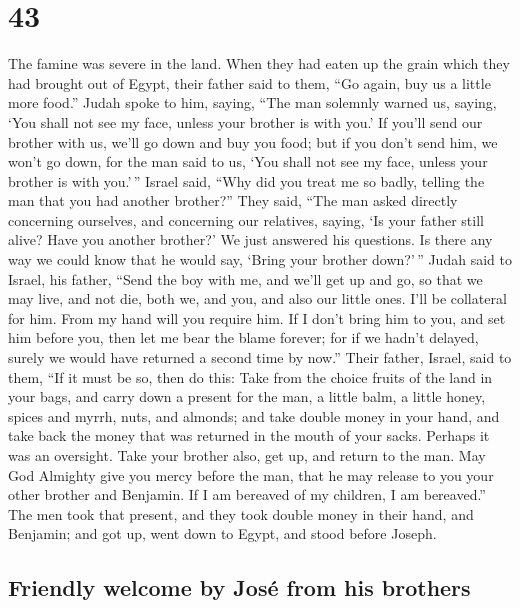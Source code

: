 \hypertarget{section-42}{%
\section{43}\label{section-42}}

 The famine was severe in the land.  When
they had eaten up the grain which they had brought out of Egypt, their
father said to them, ``Go again, buy us a little more food.''
 Judah spoke to him, saying, ``The man solemnly warned us,
saying, `You shall not see my face, unless your brother is with you.'
 If you'll send our brother with us, we'll go down and buy
you food;  but if you don't send him, we won't go down,
for the man said to us, `You shall not see my face, unless your brother
is with you.'\,''  Israel said, ``Why did you treat me so
badly, telling the man that you had another brother?'' 
They said, ``The man asked directly concerning ourselves, and concerning
our relatives, saying, `Is your father still alive? Have you another
brother?' We just answered his questions. Is there any way we could know
that he would say, `Bring your brother down?'\,''  Judah
said to Israel, his father, ``Send the boy with me, and we'll get up and
go, so that we may live, and not die, both we, and you, and also our
little ones.  I'll be collateral for him. From my hand
will you require him. If I don't bring him to you, and set him before
you, then let me bear the blame forever;  for if we
hadn't delayed, surely we would have returned a second time by now.''
 Their father, Israel, said to them, ``If it must be so,
then do this: Take from the choice fruits of the land in your bags, and
carry down a present for the man, a little balm, a little honey, spices
and myrrh, nuts, and almonds;  and take double money in
your hand, and take back the money that was returned in the mouth of
your sacks. Perhaps it was an oversight.  Take your
brother also, get up, and return to the man.  May God
Almighty give you mercy before the man, that he may release to you your
other brother and Benjamin. If I am bereaved of my children, I am
bereaved.''  The men took that present, and they took
double money in their hand, and Benjamin; and got up, went down to
Egypt, and stood before Joseph.

\hypertarget{friendly-welcome-by-josuxe9-from-his-brothers}{%
\subsection{Friendly welcome by José from his
brothers}\label{friendly-welcome-by-josuxe9-from-his-brothers}}

